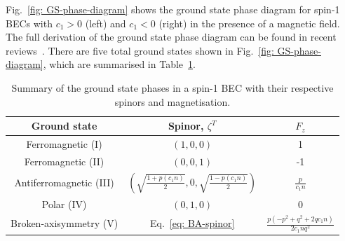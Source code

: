 Fig.~\ref{fig: GS-phase-diagram} shows the ground state phase diagram for spin-1
BECs with \(c_1 > 0\) (left) and \(c_1 < 0\) (right) in the presence of a
magnetic field.
The full derivation of the ground state phase diagram can be found in recent
reviews~\cite{Kawaguchi2012, Stamper-Kurn2013}.
There are five total ground states shown in Fig.~\ref{fig: GS-phase-diagram},
which are summarised in Table~\ref{tab: spin-1-ground-states}.
\begin{table}
    \centering
    \begin{tabular}{ccc}
        \toprule
        Ground state                          & Spinor, \(\zeta^T\)                      & \(F_z\) \\
        \midrule
        Ferromagnetic (I)                     & \((1, 0, 0)\)                            & 1       \\
        Ferromagnetic (II)                    & \((0, 0, 1)\)                            & -1      \\
        Antiferromagnetic (III)               & \(\left(\sqrt{\frac{1 + p(c_1n)}{2}}, 0,
        \sqrt{\frac{1 - p(c_1n)}{2}}\right)\) & \(\frac{p}{c_1n}\)                                 \\
        Polar (IV)                            & \((0, 1, 0)\)                            & 0       \\
        Broken-axisymmetry (V)                & Eq.~\eqref{eq: BA-spinor}
                                              & \(\frac{p(-p^2+q^2+2qc_1n)}{2c_1nq^2}\)            \\
        \bottomrule
    \end{tabular}
    \caption{\label{tab: spin-1-ground-states}Summary of the ground state
        phases in a spin-1 BEC with their respective spinors and magnetisation.}
\end{table}

